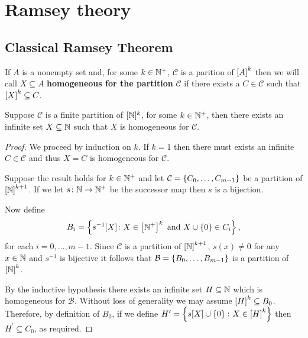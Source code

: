 

\chapter{Ramsey theory}


\section{Classical Ramsey Theorem}


\begin{dfn}
   If $A$ is a nonempty set and, for some $k\in\posnats$, $\mathcal{C}$ is a
   parition of $\subsets{k}{A}$ then we will call $X\subseteq A$
   \textbf{homogeneous for the partition} $\mathcal{C}$ if there exists a $C\in
   \mathcal{C}$ such that $\subsets{k}{X}\subseteq C$.
\end{dfn}

\begin{thm}
	Suppose $\mathcal{C}$ is a finite partition of $[\nats]^k$, for some
	$k\in\posnats$, then there exists an infinite set $X\subseteq\nats$ such
	that $X$ is homogeneous for $\mathcal{C}$.
\end{thm}
\begin{proof}
	We proceed by induction on $k$. If $k=1$ then there must exists an infinite
	$C\in\mathcal{C}$ and thus $X=C$ is homogeneous for $\mathcal{C}$.

	Suppose the result holds for $k\in\posnats$ and let
	$\mathcal{C}=\set{C_0,\dotsc,C_{m-1}}$ be a partition of
	$\subsets{k+1}{\nats}$.  If we let $s\colon\nats\to\posnats$
	be the successor map then $s$ is a bijection.

	Now define
	\begin{equation}
		B_i=\setbuild{s^{-1}[X]}{X\in\subsets{k}{\posnats}\text{ and
		}X\cup\set{0}\in C_i},
	\end{equation}
	for each $i=0,\dotsc,m-1$.  Since $\mathcal{C}$ is a partition of
	$\subsets{k+1}{\nats}$, $s(x)\neq 0$ for any $x\in\nats$ and $s^{-1}$ is
	bijective it follows that $\mathcal{B}=\set{B_0,\dotsc,B_{m-1}}$ is a
	partition of $\subsets{k}{\nats}$.

	By the inductive hypothesis there exists an infinite set $H\subseteq\nats$
	which is homogeneous for $\mathcal{B}$.  Without loss of generality we may
	assume $\subsets{k}{H}\subseteq B_0$.  Therefore, by definition of $B_0$,
	if we define $H^\prime=\setbuild{s[X]\cup\set{0}}{X\in\subsets{k}{H}}$ then
	$H^\prime\subseteq C_0$, as required.
\end{proof}


